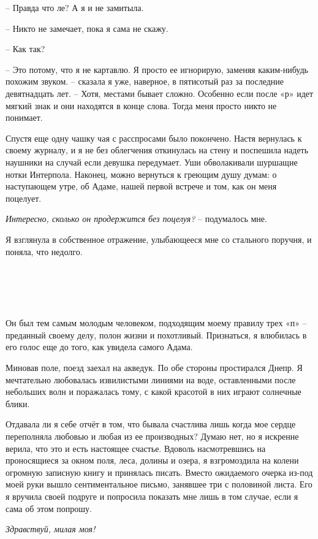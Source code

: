 \documentclass[
]{book}
\begin{document}
-- Правда что ле? А я и не замитыла.

-- Никто не замечает, пока я сама не скажу.

-- Как так?

-- Это потому, что я не картавлю. Я просто ее игнорирую, заменяя каким-нибудь похожим звуком. -- сказала я уже, наверное, в пятисотый раз за последние девятнадцать лет. -- Хотя, местами бывает сложно. Особенно если после «р» идет мягкий знак и они находятся в конце слова. Тогда меня просто никто не понимает.

Спустя еще одну чашку чая с расспросами было покончено. Настя вернулась к своему журналу, и я не без облегчения откинулась на стену и поспешила надеть наушники на случай если девушка передумает. Уши обволакивали шуршащие нотки Интерпола. Наконец, можно вернуться к греющим душу думам: о наступающем утре, об Адаме, нашей первой встрече и том, как он меня поцелует.

\emph{Интересно, сколько он продержится без поцелуя?} -- подумалось мне.

Я взглянула в собственное отражение, улыбающееся мне со стального поручня, и поняла, что недолго.

\hypertarget{chapter-23}{%
\chapter{~}\label{chapter-23}}

Он был тем самым молодым человеком, подходящим моему правилу трех «п» -- преданный своему делу, полон жизни и похотливый. Признаться, я влюбилась в его голос еще до того, как увидела самого Адама.

Миновав поле, поезд заехал на акведук. По обе стороны простирался Днепр. Я мечтательно любовалась извилистыми линиями на воде, оставленными после небольших волн и поражалась тому, с какой красотой в них играют солнечные блики.

Отдавала ли я себе отчёт в том, что бывала счастлива лишь когда мое сердце переполняла любовью и любая из ее производных? Думаю нет, но я искренне верила, что это и есть настоящее счастье. Вдоволь насмотревшись на проносящиеся за окном поля, леса, долины и озера, я взгромоздила на колени огромную записную книгу и принялась писать. Вместо ожидаемого очерка из-под моей руки вышло сентиментальное письмо, занявшее три с половиной листа. Его я вручила своей подруге и попросила показать мне лишь в том случае, если я сама об этом попрошу.

\emph{Здравствуй, милая моя!}
\end{document}
